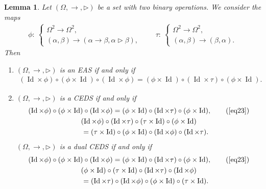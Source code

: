\documentclass[10pt,a4paper]{amsart}
\numberwithin{equation}{section}
\newtheorem{Lemma}[Theorem]{Lemma}
\begin{document}
\begin{Lemma}\label{lem2.6}
Let $(\Omega,\rightarrow,\triangleright)$ be a set with two binary operations. We consider the maps
\begin{align*}
\phi\colon\ \begin{cases}
\Omega^2 \longrightarrow \Omega^2,\\
(\alpha,\beta) \longrightarrow (\alpha \rightarrow \beta,\alpha \triangleright \beta),
\end{cases} \qquad
\tau\colon\ \begin{cases}
\Omega^2 \longrightarrow \Omega^2,\\
(\alpha,\beta) \longrightarrow (\beta,\alpha).
\end{cases}
\end{align*}
Then
\begin{enumerate}\itemsep=0pt
\item[$(1)$] $(\Omega,\rightarrow,\triangleright)$ is an EAS if and only if
\begin{align}
\label{eq23}(\operatorname{Id} \times \phi)\circ (\phi\times \operatorname{Id})\circ (\operatorname{Id} \times \phi) =(\phi \times \operatorname{Id})\circ (\operatorname{Id} \times \tau)\circ (\phi\times \operatorname{Id}).
\end{align}
\item[$(2)$] $(\Omega,\rightarrow,\triangleright)$ is a CEDS if and only if
\begin{gather}
(\operatorname{Id} \times \phi)\circ (\phi\times \operatorname{Id})\circ (\operatorname{Id} \times \phi) =(\phi \times \operatorname{Id})\circ (\operatorname{Id} \times \tau)\circ (\phi\times \operatorname{Id}),\tag{\ref{eq23}}\\
(\operatorname{Id} \times \phi)\circ (\operatorname{Id} \times \tau) \circ (\tau \times \operatorname{Id})\circ (\phi \times \operatorname{Id})\nonumber\\
\qquad =(\tau \times \operatorname{Id})\circ (\phi \times \operatorname{Id})\circ (\operatorname{Id} \times \phi)\circ (\operatorname{Id} \times \tau).\label{eq24}
\end{gather}
$(\Omega,\rightarrow,\triangleright)$ is a dual CEDS if and only if
\begin{gather}
(\operatorname{Id} \times \phi)\circ (\phi\times \operatorname{Id})\circ (\operatorname{Id} \times \phi) =(\phi \times \operatorname{Id})\circ (\operatorname{Id} \times \tau)\circ (\phi\times \operatorname{Id}),\tag{\ref{eq23}}\\
(\phi \times \operatorname{Id})\circ (\tau \times \operatorname{Id})\circ (\operatorname{Id} \times \tau)\circ (\operatorname{Id} \times \phi) \nonumber\\
\qquad=(\operatorname{Id} \times \tau)\circ (\operatorname{Id} \times \phi)\circ (\phi \times \operatorname{Id})\circ (\tau \times \operatorname{Id}).\label{eq25}
\end{gather}\end{enumerate}\end{Lemma}
\end{document}
